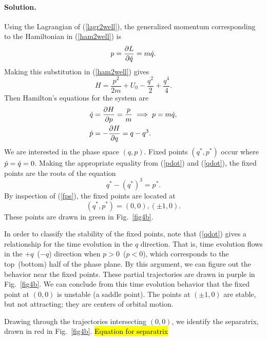 \documentclass[11pt]{article}
\newcommand{\refeq}[1]{(\ref{#1})}
\newenvironment{solution}
{
    \paragraph{Solution.}
    \ignorespaces
}
{
    \bigskip
}
\begin{document}
\begin{solution}
	Using the Lagrangian of \refeq{lagr2well}, the generalized momentum corresponding to the Hamiltonian in \refeq{ham2well} is
	\begin{equation}
		p = \pdv{L}{\dot{q}} = m\dot{q}.
	\end{equation}
	Making this substitution in \refeq{ham2well} gives
	\begin{equation}
		H = \frac{p^2}{2m} + U_0 - \frac{q^2}{2} + \frac{q^4}{4}.
	\end{equation}
	Then Hamilton's equations for the system are
	\begin{align}
		\dot{q} &= \pdv{H}{p} = \frac{p}{m} \implies p = m\dot{q}, \label{qdot} \\
		\dot{p} &= -\pdv{H}{q} = q - q^3. \label{pdot}
	\end{align}
	We are interested in the phase space $(q, p)$.  Fixed points $(q^*, p^*)$ occur where $\dot{p} = \dot{q} = 0$.  Making the appropriate equality from \refeq{pdot} and \refeq{qdot}, the fixed points are the roots of the equation
	\begin{equation} \label{fps}
		q^* - (q^*)^3 = p^*.
	\end{equation}
	By inspection of \refeq{fps}, the fixed points are located at
	\begin{equation}
		(q^*, p^*) = (0,0), (\pm 1, 0).
	\end{equation}
	These points are drawn in green in Fig.~\ref{fig4b}.
	
	In order to classify the stability of the fixed points, note that \refeq{qdot} gives a relationship for the time evolution in the $q$ direction.  That is, time evolution flows in the $+q$~($-q$) direction when $p > 0$~($p < 0$), which corresponds to the top~(bottom) half of the phase plane.  By this argument, we can figure out the behavior near the fixed points.  These partial trajectories are drawn in purple in Fig.~\ref{fig4b}.  We can conclude from this time evolution behavior that the fixed point at $(0, 0)$ is unstable (a saddle point).  The points at $(\pm 1, 0)$ are stable, but not attracting; they are centers of orbital motion.
	
	Drawing through the trajectories intersecting $(0,0)$, we identify the separatrix, drawn in red in Fig.~\ref{fig4b}.  \hl{Equation for separatrix}
	

\end{solution}
\end{document}
